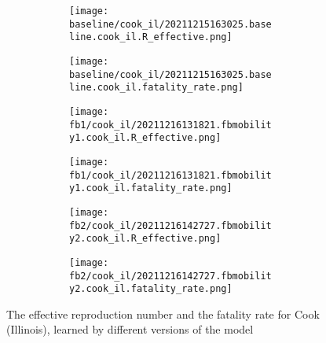 \begin{figure}[!htb]
    \centering

    \begin{subfigure}[b]{\linewidth}
        \centering
        \begin{subfigure}[b]{0.4\linewidth}
            \texttt{[image: baseline/cook\_il/20211215163025.baseline.cook\_il.R\_effective.png]}
        \end{subfigure}
        \begin{subfigure}[b]{0.4\linewidth}
            \texttt{[image: baseline/cook\_il/20211215163025.baseline.cook\_il.fatality\_rate.png]}
        \end{subfigure}
    \end{subfigure}

    \begin{subfigure}[b]{\linewidth}
        \centering
        \begin{subfigure}[b]{0.4\linewidth}
            \texttt{[image: fb1/cook\_il/20211216131821.fbmobility1.cook\_il.R\_effective.png]}
        \end{subfigure}
        \begin{subfigure}[b]{0.4\linewidth}
            \texttt{[image: fb1/cook\_il/20211216131821.fbmobility1.cook\_il.fatality\_rate.png]}
        \end{subfigure}
    \end{subfigure}

    \begin{subfigure}[b]{\linewidth}
        \centering
        \begin{subfigure}[b]{0.4\linewidth}
            \texttt{[image: fb2/cook\_il/20211216142727.fbmobility2.cook\_il.R\_effective.png]}
        \end{subfigure}
        \begin{subfigure}[b]{0.4\linewidth}
            \texttt{[image: fb2/cook\_il/20211216142727.fbmobility2.cook\_il.fatality\_rate.png]}
        \end{subfigure}
    \end{subfigure}

    \caption{The effective reproduction number and the fatality rate for Cook (Illinois), learned by different versions of the model}
    \label{fig:R0-and-fatality-cook}
\end{figure}


